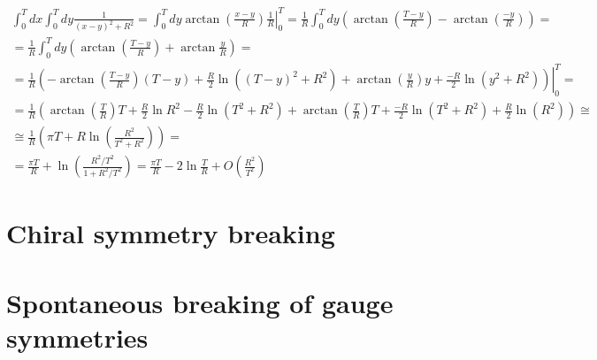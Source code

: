 \documentclass[twoside]{amsart}
\begin{document}
\[
\begin{gathered}
  \int_0^T dx \int_0^T dy \frac{1}{ (x-y)^2 + R^2 } = \int_0^T dy   \left. \arctan{ \left( \frac{x-y}{R} \right) }  \frac{1}{R} \right|_0^T = \frac{1}{R} \int_0^T dy \left(  \arctan{ \left( \frac{T-y}{R} \right) } - \arctan{ \left( \frac{-y}{R} \right)} \right) = \\
  = \frac{1}{R} \int_0^T dy \left( \arctan{ \left( \frac{T-y}{R} \right) } + \arctan{ \frac{y}{R} } \right) = \\
  = \frac{1}{R} \left. \left( - \arctan{ \left( \frac{T-y}{R} \right) } ( T-y) + \frac{R}{2} \ln{ ((T-y)^2 + R^2 ) } + \arctan{ \left( \frac{y}{R} \right) } y + \frac{-R}{2} \ln{ (y^2 + R^2) } \right) \right|_0^T  = \\
  = \frac{1}{R} \left( \arctan{ \left( \frac{T}{R} \right) } T  + \frac{R}{2} \ln{ R^2 } - \frac{R}{2} \ln{ (T^2 + R^2 ) } + \arctan{ \left( \frac{T}{R} \right) } T + \frac{-R}{2} \ln{ (T^2 + R^2 ) } + \frac{R}{2} \ln{ (R^2 ) }    \right) \cong \\
  \cong \frac{1}{R} \left( \pi T + R \ln{ \left( \frac{R^2}{ T^2 + R^2 } \right) } \right) = \\
  = \frac{\pi T}{R} + \ln{ \left( \frac{ R^2 / T^2 }{ 1 + R^2 /T^2 } \right) } = \frac{\pi T}{R}  - 2\ln{ \frac{T}{R} } + O\left( \frac{R^2}{ T^2} \right) 
\end{gathered}
\]



\section{ Chiral symmetry breaking}

\section{ Spontaneous breaking of gauge symmetries}
\end{document}
